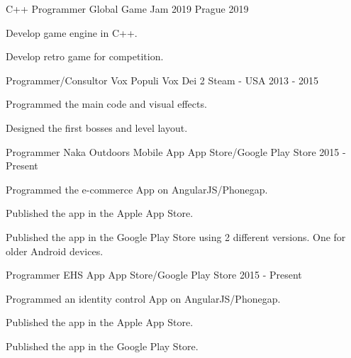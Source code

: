 \begin{cventries}
  \cventry
  {C++ Programmer} %
  {Global Game Jam 2019} %
  {Prague} %
  {2019} %
  {
  \begin{cvitems} %
    \item {Develop game engine in C++.}
    \item {Develop retro game for competition.}
  \end{cvitems}
  }

  \cventry
    {Programmer/Consultor} %
    {Vox Populi Vox Dei 2} %
    {Steam - USA} %
    {2013 - 2015} %
    {
      \begin{cvitems} %
        \item {Programmed the main code and visual effects.}
        \item {Designed the first bosses and level layout.}
      \end{cvitems}
    }

  \cventry
    {Programmer} %
    {Naka Outdoors Mobile App} %
    {App Store/Google Play Store} %
    {2015 - Present} %
    {
      \begin{cvitems} %
        \item {Programmed the e-commerce App on AngularJS/Phonegap.}
        \item {Published the app in the Apple App Store.}
        \item {Published the app in the Google Play Store using 2 different versions. One for older Android devices.}
      \end{cvitems}
    }
  \cventry
    {Programmer} %
    {EHS App} %
    {App Store/Google Play Store} %
    {2015 - Present} %
    {
      \begin{cvitems} %
        \item {Programmed an identity control App on AngularJS/Phonegap.}
        \item {Published the app in the Apple App Store.}
        \item {Published the app in the Google Play Store.}
      \end{cvitems}
    }

\end{cventries}
